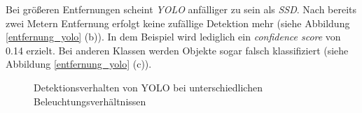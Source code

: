 Bei größeren Entfernungen scheint \textit{YOLO} anfälliger zu sein als \textit{SSD}. Nach bereits zwei Metern Entfernung erfolgt keine zufällige Detektion mehr (siehe Abbildung \ref{entfernung_yolo} (b)). In dem Beispiel wird lediglich ein \textit{confidence score} von 0.14 erzielt. Bei anderen Klassen werden Objekte sogar falsch klassifiziert (siehe Abbildung \ref{entfernung_yolo} (c)).

\begin{figure}[H]
	\hfill
	\hfill
	\hfill
	\hfill
	\hfill
	\caption{Detektionsverhalten von YOLO bei unterschiedlichen Beleuchtungsverhältnissen}
	\label{sicht_yolo}
\end{figure}

